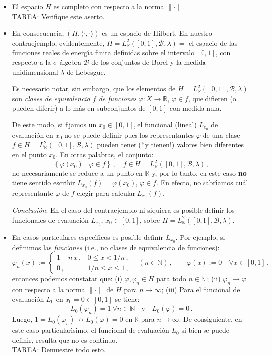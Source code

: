 \begin{enumerate}
\begin{itemize}
\item
El espacio $H$ es completo con respecto a la norma $\|\cdot\|$.\\
TAREA: Verifique este aserto.

\item
En consecuencia, $(H,\langle\cdot,\cdot\rangle)$ es un espacio de
Hilbert.
En nuestro contraejemplo, evidentemente, 
$H=L_{\mathbb{R}}^2([0,1],\mathcal{B},\lambda)=$ el espacio de las
funciones reales de energ\'\i a finita definidas sobre el intervalo
$[0,1]$, con respecto a la $\sigma$-\'algebra $\mathcal{B}$ de los
conjuntos de Borel y la medida unidimensional $\lambda$ de Lebesgue.

Es necesario notar, sin embargo, que los elementos de
$H=L_{\mathbb{R}}^2([0,1],\mathcal{B},\lambda)$
son {\em clases de equivalencia $f$ de funciones\/}
$\varphi:X\to\mathbb{R}$, $\varphi\in f$, que difieren (o pueden diferir)
a lo m\'as en subconjuntos de $[0,1]$ con medida nula.

De este modo, si fijamos un $x_0\in[0,1]$, el funcional (lineal)
$L_{x_0}$ de evaluaci\'on en $x_0$ no se puede definir pues los
representantes $\varphi$ de una clase
$f\in H=L_{\mathbb{R}}^2([0,1],\mathcal{B},\lambda)$
pueden tener (!`y tienen!) valores bien diferentes en el punto $x_0$.
En otras palabras, el conjunto:
$$
\left\{ \varphi(x_0)\mid \varphi\in f \right\}\,,\quad
f\in H=L_{\mathbb{R}}^2([0,1],\mathcal{B},\lambda)\,,
$$
no necesariamente se reduce a un punto en $\mathbb{R}$ y, 
por lo tanto, en este caso {\bf no} tiene sentido escribir
$L_{x_0}(f)=\varphi(x_0)$, $\varphi\in f$.
En efecto, no sabr\'\i amos cu\'al representante $\varphi$ de $f$
elegir para calcular $L_{x_0}(f)$.

\smallskip
{\em Conclusi\'on\/}: En el caso del contraejemplo ni siquiera es
posible definir los funcionales de evaluaci\'on $L_{x_0}$,
$x_0\in[0,1]$, sobre $H=L_{\mathbb{R}}^2([0,1],\mathcal{B},\lambda)$.

\item
En casos particulares espec\'\i ficos es posible definir $L_{x_0}$.
Por ejemplo, si definimos las {\em funciones\/} (i.e., no clases
de equivalencia de funciones):
$$
\varphi_n(x):=
\begin{cases}
1-n\,x\,, & 0\leq x< 1/n\,, \\
0\,, & 1/n\leq x\leq 1\,,
\end{cases}
\quad (n\in\mathbb{N})\,,\qquad
\varphi(x):=0\quad\forall x\in[0,1]\,,
$$
entonces podemos constatar que:
(i) $\varphi,\varphi_n\in H$ para todo $n\in\mathbb{N}\,$;
(ii) $\varphi_n\to \varphi$ con respecto a la norma $\|\cdot\|$
     de $H$ para $n\to\infty$;
(iii) Para el funcional de evaluaci\'on $L_0$ en $x_0=0\in[0,1]$
      se tiene:
$$
L_0(\varphi_n)=1\ \forall n\in\mathbb{N}\quad\text{y}\quad
L_0(\varphi)=0\,.
$$
Luego, $1=L_0(\varphi_n)\not\to L_0(\varphi)=0$ en $\mathbb{R}$
para $n\to\infty$.
De consiguiente, en este caso particular\'\i simo, el funcional de
evaluaci\'on $L_0$ si bien se puede definir, resulta que no es
continuo. \\
TAREA: Demuestre todo esto.


\end{itemize}
\end{enumerate}

